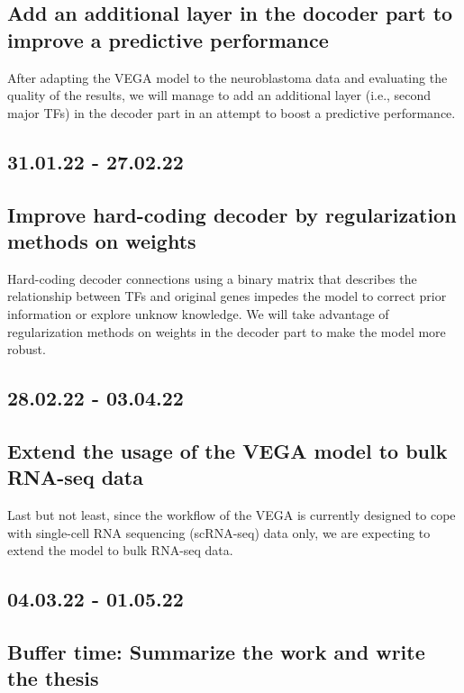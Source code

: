 \documentclass[12pt, a4paper]{article}
\begin{document}
\vspace{-3mm} \subsection*{\normalsize Add an additional layer in the docoder part to improve a predictive performance}
After adapting the VEGA model to the neuroblastoma data and evaluating the quality of the results, we will manage to add an additional layer (i.e., second major TFs) in the decoder part in an attempt to boost a predictive performance.
\vspace{-3mm} \subsection*{\normalsize 31.01.22 - 27.02.22}
\vspace{-3mm} \subsection*{\normalsize Improve hard-coding decoder by regularization methods on weights}
Hard-coding decoder connections using a binary matrix that describes the relationship between TFs and original genes impedes the model to correct prior information or explore unknow knowledge. We will take advantage of regularization methods on weights in the decoder part to make the model more robust.
\vspace{-3mm} \subsection*{\normalsize 28.02.22 - 03.04.22}
\vspace{-3mm} \subsection*{\normalsize Extend the usage of the VEGA model to bulk RNA-seq data}
Last but not least, since the workflow of the VEGA is currently designed to cope with single-cell RNA sequencing (scRNA-seq) data only, we are expecting to extend the model to bulk RNA-seq data.
\vspace{-3mm} \subsection*{\normalsize 04.03.22 - 01.05.22}
\vspace{-3mm} \subsection*{\normalsize Buffer time: Summarize the work and write the thesis}

\newpage

\nocite{*}

\end{document}
